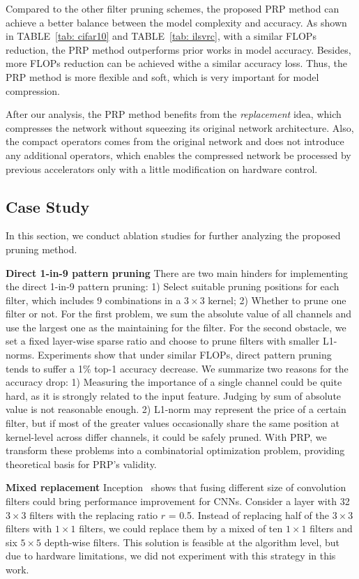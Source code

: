 \documentclass[journal,article,submit,pdftex,moreauthors]{Definitions/mdpi}
\begin{document}
Compared to the other filter pruning schemes, the proposed PRP method can achieve a better balance between the model complexity and accuracy. As shown in TABLE~\ref{tab: cifar10} and TABLE~\ref{tab: ilsvrc}, with a similar FLOPs reduction, the PRP method outperforms prior works in model accuracy. Besides, more FLOPs reduction can be achieved withe a similar accuracy loss. Thus, the PRP method is more flexible and soft, which is very important for model compression.

After our analysis, the PRP method benefits from the \textit{replacement} idea, which compresses the network without squeezing its original network architecture. Also, the compact operators comes from the original network and does not introduce any additional operators, which enables the compressed network be processed by previous accelerators only with a little modification on hardware control.

\subsection{Case Study}
In this section, we conduct ablation studies for further analyzing the proposed pruning method.

\textbf{Direct 1-in-9 pattern pruning} There are two main hinders for implementing the direct 1-in-9 pattern pruning: 1) Select suitable pruning positions for each filter, which includes 9 combinations in a $3\times 3$ kernel; 2) Whether to prune one filter or not. For the first problem, we sum the absolute value of all channels and use the largest one as the maintaining for the filter. For the second obstacle, we set a fixed layer-wise sparse ratio and choose to prune filters with smaller L1-norms. Experiments show that under similar FLOPs, direct pattern pruning tends to suffer a 1\% top-1 accuracy decrease. We summarize two reasons for the accuracy drop: 1) Measuring the importance of a single channel could be quite hard, as it is strongly related to the input feature. Judging by sum of absolute value is not reasonable enough. 2) L1-norm may represent the price of a certain filter, but if most of the greater values occasionally share the same position at kernel-level across differ channels, it could be safely pruned. With PRP, we transform these problems into a combinatorial optimization problem, providing theoretical basis for PRP's validity.

\textbf{Mixed replacement} Inception~\cite{inception} shows that fusing different size of convolution filters could bring performance improvement for CNNs. Consider a layer with 32 $3\times 3$ filters with the replacing ratio $r$ = 0.5. Instead of replacing half of the $3\times 3$ filters with $1\times 1$ filters, we could replace them by a mixed of ten $1\times 1$ filters and six $5\times 5$ depth-wise filters. This solution is feasible at the algorithm level, but due to hardware limitations, we did not experiment with this strategy in this work.
\end{document}
